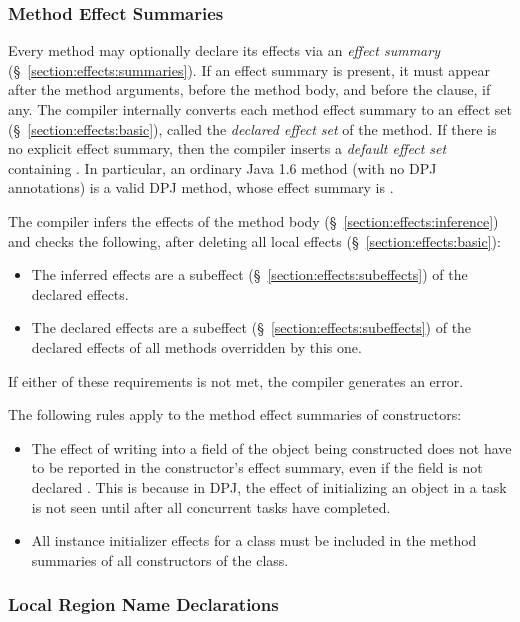 \subsubsection{Method Effect Summaries}
\label{section:class-def:methods:effect-summaries}

Every method may optionally declare its effects via an \emph{effect
  summary} (\S~\ref{section:effects:summaries}).  If an effect summary
is present, it must appear after the method arguments, before the
method body, and before the  clause, if any.  The compiler
internally converts each method effect summary to an effect set
(\S~\ref{section:effects:basic}), called the \emph{declared effect set}
of the method.  If there is no explicit effect summary, then the
compiler inserts a \emph{default effect set} containing .  In particular, an ordinary Java 1.6 method (with no DPJ
annotations) is a valid DPJ method, whose effect summary is
.

The compiler infers the effects of the method body
(\S~\ref{section:effects:inference}) and checks the following, after
deleting all local effects (\S~\ref{section:effects:basic}):
%
\begin{itemize}
%
\item The inferred effects are a subeffect
  (\S~\ref{section:effects:subeffects}) of the declared effects.
%
\item The declared effects are a subeffect
  (\S~\ref{section:effects:subeffects}) of the declared effects of all
  methods overridden by this one.
%
\end{itemize}
%
If either of these requirements is not met, the compiler generates an
error.

 The following rules apply to the method effect
summaries of constructors:
%
\begin{itemize}
%
\item The effect of writing into a field of the object being
  constructed does not have to be reported in the constructor's effect
  summary, even if the field is not declared .  This is
  because in DPJ, the effect of initializing an object in a task is
  not seen until after all concurrent tasks have completed.
%
\item All instance initializer effects for a class must be included in
  the method summaries of all constructors of the class.
%
\end{itemize}

\subsubsection{Local Region Name Declarations}
\label{section:class-def:methods:local-rgn-decl}

